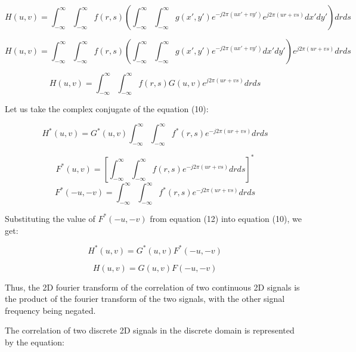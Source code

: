 \documentclass[12pt]{article}
\begin{document}
\begin{equation}
    H(u, v) = \int_{-\infty}^{\infty} \int_{-\infty}^{\infty} f(r, s) \left( \int_{-\infty}^{\infty} \int_{-\infty}^{\infty} g(x', y') e^{-j2\pi(ux'+vy')} e^{j2\pi(ur+vs)} dx' dy' \right) dr ds
\end{equation}

\begin{equation}
    H(u, v) = \int_{-\infty}^{\infty} \int_{-\infty}^{\infty} f(r, s) \left( \int_{-\infty}^{\infty} \int_{-\infty}^{\infty} g(x', y') e^{-j2\pi(ux'+vy')} dx' dy' \right) e^{j2\pi(ur+vs)} dr ds
\end{equation}

\begin{equation}
    H(u, v) = \int_{-\infty}^{\infty} \int_{-\infty}^{\infty} f(r, s) G(u,v) e^{j2\pi(ur+vs)} dr ds
\end{equation}


Let us take the complex conjugate of the equation (10):

\begin{equation}
    H^*(u, v) = G^*(u,v) \int_{-\infty}^{\infty} \int_{-\infty}^{\infty} f^*(r, s)  e^{-j2\pi(ur+vs)} dr ds
\end{equation}

\begin{equation}
    F^*(u, v) = [\int_{-\infty}^{\infty} \int_{-\infty}^{\infty} f(r, s)  e^{-j2\pi(ur+vs)} dr ds]^*
\end{equation}
\begin{equation}
    F^*(-u, -v) = \int_{-\infty}^{\infty} \int_{-\infty}^{\infty} f^*(r, s)  e^{-j2\pi(ur+vs)} dr ds
\end{equation}

Substituting the value of $F^*(-u, -v)$ from equation (12) into equation (10), we get:

\begin{equation}
    H^*(u, v) = G^*(u,v) F^*(-u, -v)
\end{equation}

\begin{equation}
    H(u, v) = G(u,v) F(-u, -v)
\end{equation}

Thus, the 2D fourier transform of the correlation of two continuous 2D signals is the product of the fourier transform of the two signals, with the other signal frequency being negated.


The correlation of two discrete 2D signals in the discrete domain is represented by the equation:
\end{document}
